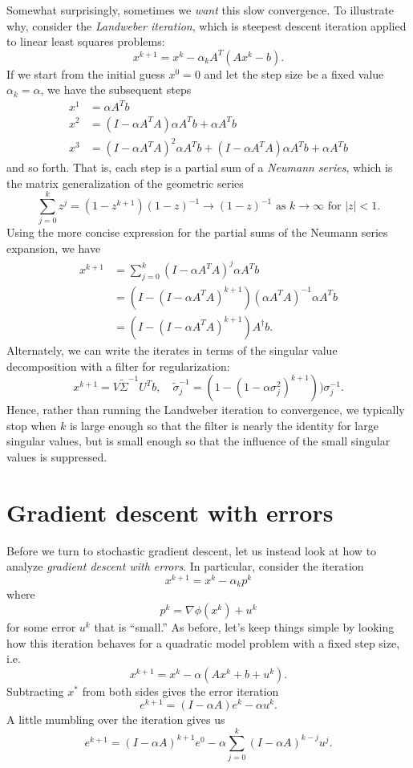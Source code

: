 \documentclass[12pt, leqno]{article} %
\begin{document}
Somewhat surprisingly, sometimes we {\em want} this slow convergence.
To illustrate why, consider the {\em Landweber iteration}, which
is steepest descent iteration applied to linear least squares
problems:
\[
  x^{k+1} = x^k - \alpha_k A^T (Ax^k-b).
\] 
If we start from the initial guess $x^0 = 0$ and let the step size
be a fixed value $\alpha_k = \alpha$, we have the subsequent steps
\begin{align*}
  x^1 &= \alpha A^T b \\
  x^2 &= (I-\alpha A^T A) \alpha A^T b + \alpha A^T b \\
  x^3 &= (I-\alpha A^T A)^2 \alpha A^T b +
         (I-\alpha A^T A) \alpha A^T b +
         \alpha A^T b
\end{align*}
and so forth.
That is, each step is a partial sum of a {\em Neumann series},
which is the matrix generalization of the geometric series
\[
  \sum_{j=0}^k z^j = (1-z^{k+1})(1-z)^{-1} \rightarrow (1-z)^{-1}
  \mbox{ as } k \rightarrow \infty \mbox{ for } |z| < 1.
\]
Using the more concise expression for the partial sums of the
Neumann series expansion, we have
\begin{align*}
  x^{k+1}
  &= \sum_{j=0}^k (I-\alpha A^TA)^j \alpha A^T b \\
  &= (I-(I-\alpha A^TA)^{k+1}) (\alpha A^TA)^{-1} \alpha A^T b \\
  &= (I-(I-\alpha A^TA)^{k+1}) A^\dagger b.
\end{align*}
Alternately, we can write the iterates in terms of the singular value
decomposition with a filter for regularization:
\[
x^{k+1} = V \tilde{\Sigma}^{-1} U^T b, \quad
\tilde{\sigma}_j^{-1} = (1-(1-\alpha \sigma_j^2)^{k+1})) \sigma_j^{-1}.
\]
Hence, rather than running the Landweber iteration to convergence,
we typically stop when $k$ is large enough so that the filter is
nearly the identity for large singular values, but is small enough
so that the influence of the small singular values is suppressed.

\section{Gradient descent with errors}

Before we turn to stochastic gradient descent, let us instead look at
how to analyze {\em gradient descent with errors}.  In particular,
consider the iteration
\[
  x^{k+1} = x^k - \alpha_k p^k
\]
where
\[
  p^k = \nabla \phi(x^k) + u^k
\]
for some error $u^k$ that is ``small.''  As before, let's keep things
simple by looking how this iteration behaves for a quadratic model
problem with a fixed step size, i.e.
\[
  x^{k+1} = x^k - \alpha (Ax^k + b + u^k).
\]
Subtracting $x^*$ from both sides gives the error iteration
\[
  e^{k+1} = (I-\alpha A) e^k - \alpha u^k.
\]  
A little mumbling over the iteration gives us
\[
  e^{k+1} = (I-\alpha A)^{k+1} e^0 - \alpha \sum_{j=0}^k (I-\alpha A)^{k-j} u^j.
\]
\end{document}
